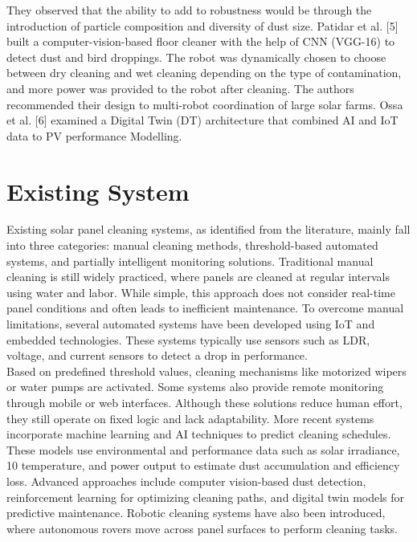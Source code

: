 \documentclass[10pt]{report}
\begin{document}
\begin{sloppypar}
{{{\begin{sloppypar}
They observed that
the ability to add to robustness would be through the introduction of particle composition and diversity of dust size. Patidar et al. [5] built a computer-vision-based
floor cleaner with the help of CNN (VGG-16) to detect dust and bird droppings. The
robot was dynamically chosen to choose between dry cleaning and wet cleaning depending on the type of contamination, and more power was provided to the robot
after cleaning. The authors recommended their design to multi-robot coordination
of large solar farms. Ossa et al. [6] examined a Digital Twin (DT) architecture that
combined AI and IoT data to PV performance Modelling.


\section{Existing System}
\hspace{0.5cm}
Existing solar panel cleaning systems, as identified from the literature, mainly
fall into three categories: manual cleaning methods, threshold-based automated systems, and partially intelligent monitoring solutions. Traditional manual cleaning is
still widely practiced, where panels are cleaned at regular intervals using water and
labor. While simple, this approach does not consider real-time panel conditions and
often leads to inefficient maintenance. To overcome manual limitations, several automated systems have been developed using IoT and embedded technologies. These
systems typically use sensors such as LDR, voltage, and current sensors to detect a
drop in performance.\\

Based on predefined threshold values, cleaning mechanisms
like motorized wipers or water pumps are activated. Some systems also provide remote monitoring through mobile or web interfaces. Although these solutions reduce
human effort, they still operate on fixed logic and lack adaptability. More recent
systems incorporate machine learning and AI techniques to predict cleaning schedules. These models use environmental and performance data such as solar irradiance,
10
temperature, and power output to estimate dust accumulation and efficiency loss.
Advanced approaches include computer vision-based dust detection, reinforcement
learning for optimizing cleaning paths, and digital twin models for predictive maintenance. Robotic cleaning systems have also been introduced, where autonomous
rovers move across panel surfaces to perform cleaning tasks. 


\end{sloppypar}}}}
\end{sloppypar}
\end{document}
